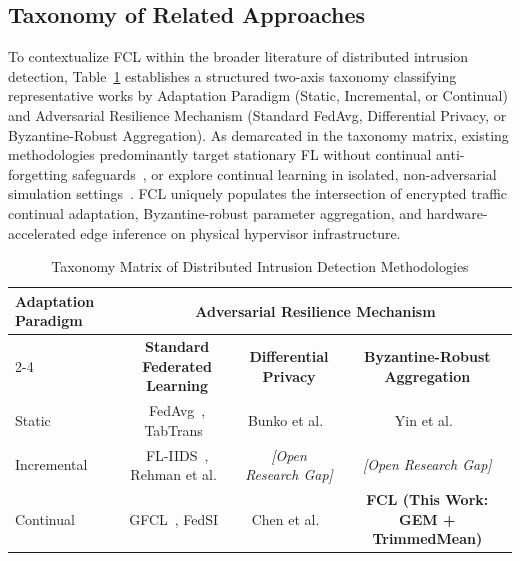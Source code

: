 \documentclass[journal,10pt,twocolumn]{IEEEtran}
\begin{document}
\subsection{Taxonomy of Related Approaches}
To contextualize FCL within the broader literature of distributed intrusion detection, Table~\ref{tab:taxonomy_matrix} establishes a structured two-axis taxonomy classifying representative works by Adaptation Paradigm (Static, Incremental, or Continual) and Adversarial Resilience Mechanism (Standard FedAvg, Differential Privacy, or Byzantine-Robust Aggregation). As demarcated in the taxonomy matrix, existing methodologies predominantly target stationary FL without continual anti-forgetting safeguards~\cite{mcmahan2017communication, fares2025federated}, or explore continual learning in isolated, non-adversarial simulation settings~\cite{kirkpatrick2017overcoming, zhang2023communication}. FCL uniquely populates the intersection of encrypted traffic continual adaptation, Byzantine-robust parameter aggregation, and hardware-accelerated edge inference on physical hypervisor infrastructure.

\begin{table}[t]
\caption{Taxonomy Matrix of Distributed Intrusion Detection Methodologies}
\label{tab:taxonomy_matrix}
\centering
\small
\renewcommand{\arraystretch}{1.2}
\begin{tabular*}{\textwidth}{@{\extracolsep{\fill}}lccc@{}}
\toprule
\textbf{Adaptation Paradigm} & \multicolumn{3}{c}{\textbf{Adversarial Resilience Mechanism}} \\
\cmidrule(lr){2-4}
& \textbf{Standard Federated Learning} & \textbf{Differential Privacy} & \textbf{Byzantine-Robust Aggregation} \\
\midrule
Static & FedAvg~\cite{mcmahan2017communication}, TabTrans~\cite{fares2025federated} & Bunko et al.~\cite{bunko2026survey} & Yin et al.~\cite{yin2018byzantine} \\
Incremental & FL-IIDS~\cite{jin2024fliids}, Rehman et al.~\cite{rehman2026incremental} & \emph{[Open Research Gap]} & \emph{[Open Research Gap]} \\
Continual & GFCL~\cite{talpur2022gfcl}, FedSI~\cite{zhang2023communication} & Chen et al.~\cite{chen2024evaluating} & \textbf{FCL (This Work: GEM + TrimmedMean)} \\
\bottomrule
\end{tabular*}
\end{table}

\end{document}
